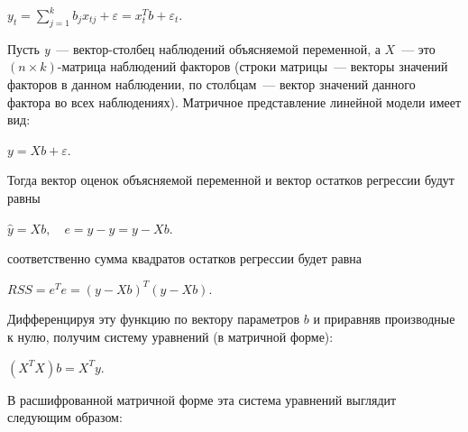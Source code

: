 \documentclass[a4paper]{article}
\begin{document}
{{{{{{{{\begin{center}
 {{\(y_{t} = \sum\limits_{j = 1}^{k}b_{j}x_{tj} + \varepsilon = x_{t}^{T}b + \varepsilon_{t}\)}}.
\end{center}

Пусть \emph{y}~--- вектор-столбец наблюдений объясняемой переменной, а
{{\(X\)}}~--- это {{\(({n \times k})\)}}-матрица наблюдений факторов
(строки матрицы~--- векторы значений факторов в данном наблюдении, по
столбцам~--- вектор значений данного фактора во всех наблюдениях).
Матричное представление линейной модели имеет вид:

\begin{center}
 {{\(y = Xb + \varepsilon\)}}.
\end{center}

Тогда вектор оценок объясняемой переменной и вектор остатков регрессии
будут равны

\begin{center}
    {{\(\hat{y} = Xb,\quad e = y - \hat{y} = y - Xb\)}}.
\end{center}

соответственно сумма квадратов остатков регрессии будет равна

\begin{center}
    {{\(RSS = e^{T}e = (y - Xb)^{T}(y - Xb)\)}}.
\end{center}

Дифференцируя эту функцию по вектору параметров {{\(b\)}} и приравняв
производные к нулю, получим систему уравнений (в матричной форме):

\begin{center}
    {{\((X^{T}X)b = X^{T}y\)}}.
\end{center}

В расшифрованной матричной форме эта система уравнений выглядит
следующим образом:

}}}}}}}}
\end{document}
